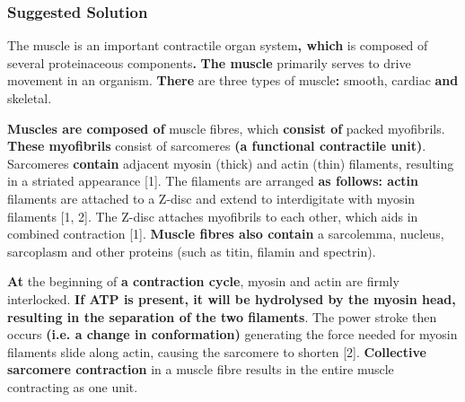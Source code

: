 \documentclass{article}
\begin{document}
\newpage
\subsubsection*{Suggested Solution}

The muscle is an important contractile organ system\textbf{, which} is composed of several proteinaceous components\textbf{.} \textbf{The muscle }primarily serves to drive movement in an organism. \textbf{There} are three types of muscle\textbf{:} smooth, cardiac\textbf{ and }skeletal. 

\textbf{Muscles are composed of} muscle fibres, which \textbf{consist of }packed myofibrils. \textbf{These myofibrils }consist of sarcomeres \textbf{(a functional contractile unit)}. Sarcomeres \textbf{contain} adjacent myosin (thick) and actin (thin) filaments, resulting in a striated appearance [1]. The filaments are arranged \textbf{as follows: actin} filaments are attached to a Z-disc and extend to interdigitate with myosin filaments [1, 2]. The Z-disc attaches myofibrils to each other, which aids in combined contraction [1]. \textbf{Muscle fibres also contain} a sarcolemma, nucleus, sarcoplasm and other proteins (such as titin, filamin and spectrin).

\textbf{At} the beginning of \textbf{a contraction cycle}, myosin and actin are firmly interlocked. \textbf{If ATP is present, it will be hydrolysed by the myosin head, resulting in the separation of the two filaments}. The power stroke then occurs \textbf{(i.e. a change in conformation)} generating the force needed for myosin filaments slide along actin, causing the sarcomere to shorten [2]. \textbf{Collective sarcomere contraction} in a muscle fibre results in the entire muscle contracting as one unit. 
\end{document}
